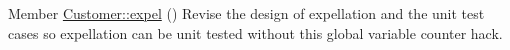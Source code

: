 
\begin{DoxyRefList}
\item[Member \mbox{\hyperlink{classCustomer_a80fb88d28103c5976202ef144a85788c}{Customer::expel}} ()]\label{todo__todo000002}%
%
Revise the design of expellation and the unit test cases so expellation can be unit tested without this global variable counter hack. 
\end{DoxyRefList}
